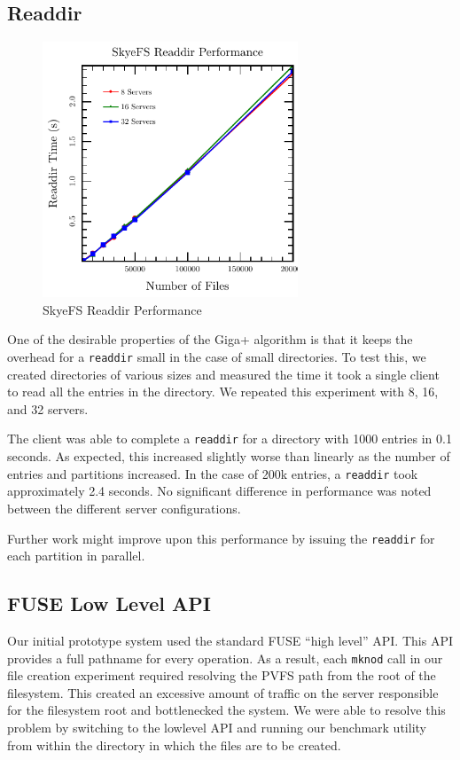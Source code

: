 \documentclass[twocolumn,letterpaper]{article}
\newcommand{\code}[1]{\texttt{#1}}
\begin{document}
\subsection{Readdir}
\begin{figure}
\begin{center}
\includegraphics[width=3in]{graph-readdir}
\end{center}
\caption{SkyeFS Readdir Performance}
\end{figure}
One of the desirable properties of the Giga+ algorithm is that it keeps the
overhead for a \code{readdir} small in the case of small directories.  To test
this, we created directories of various sizes and measured the time it took a
single client to read all the entries in the directory.  We repeated this
experiment with 8, 16, and 32 servers.

The client was able to complete a \code{readdir} for a directory with 1000
entries in 0.1 seconds.  As expected, this increased slightly worse than
linearly as the number of entries and partitions increased.  In the case of
200k entries, a \code{readdir} took approximately 2.4 seconds.  No significant
difference in performance was noted between the different server
configurations.

Further work might improve upon this performance by issuing the \code{readdir}
for each partition in parallel.

\subsection{FUSE Low Level API}
Our initial prototype system used the standard FUSE ``high level'' API.  This
API provides a full pathname for every operation.  As a result, each
\code{mknod} call in our file creation experiment required resolving the PVFS
path from the root of the filesystem.  This created an excessive amount of
traffic on the server responsible for the filesystem root and bottlenecked the
system.  We were able to resolve this problem by switching to the lowlevel API
and running our benchmark utility from within the directory in which the files
are to be created.
\end{document}
